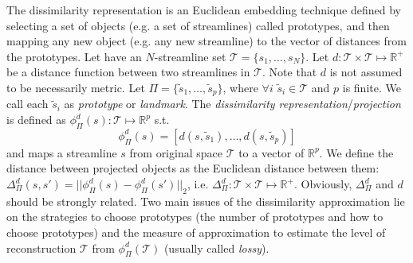The dissimilarity representation is an Euclidean embedding technique defined by selecting a set of objects (e.g. a set of streamlines) called prototypes, and then mapping any new object (e.g. any new streamline) to the vector of distances from the prototypes. Let have an $N$-streamline set $\mathcal{T} = \{s_1,\ldots,s_N\}$. 
Let $d:\mathcal{T} \times
\mathcal{T} \mapsto \mathbb{R}^+$ be a distance function between two streamlines in $\mathcal{T}$. Note that $d$ is not assumed to be necessarily metric. Let $\Pi = \{\tilde{s}_1, \ldots, \tilde{s}_p\}$, where $\forall i$ $\tilde{s}_i \in \mathcal{\mathcal{T}}$ and $p$ is finite. We call each $\tilde{s}_i$ as \emph{prototype} or \emph{landmark}. The \emph{dissimilarity representation}/\emph{projection} is defined as $\phi_{\Pi}^d(s):\mathcal{\mathcal{T}} \mapsto \mathbb{R}^p$
s.t. 
\begin{equation}
  \phi_{\Pi}^d(s) = [d(s,\tilde{s}_1) ,\ldots, d(s,\tilde{s}_p)]
\label{eq:dissimilarity_representation}
\end{equation}
and maps a streamline $s$ from original space $\mathcal{T}$ to a vector of $\mathbb{R}^p$. 
We define the distance between projected objects as the Euclidean distance between them: $\Delta_{\Pi}^d(s, s') = || \phi_{\Pi}^d(s) - \phi_{\Pi}^d(s') ||_2$, i.e. $\Delta_{\Pi}^d:\mathcal{T} \times \mathcal{T} \mapsto \mathbb{R}^+$. 
Obviously, $\Delta_{\Pi}^d$ and $d$ should be strongly related.
Two main issues of the dissimilarity approximation lie on the strategies to choose prototypes (the number of prototypes and how to choose prototypes) and the measure of approximation to estimate the level of reconstruction $\mathcal{T}$ from $\phi_{\Pi}^d(\mathcal{T})$ (usually called \emph{lossy}). 

